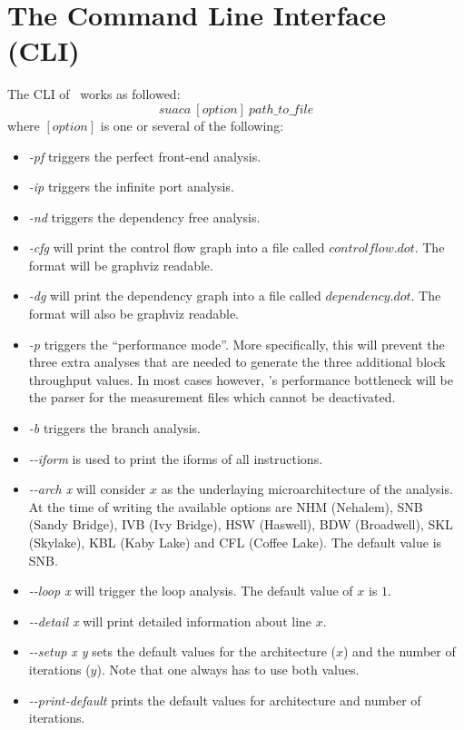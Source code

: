\section{The Command Line Interface (CLI)}
The CLI of \suaca\ works as followed:\\
\[
suaca\ [option]\ path\_to\_file
\]
where $[option]$ is one or several of the following:
\begin{itemize}
    \item \emph{-pf} triggers the perfect front-end analysis.
    \item \emph{-ip} triggers the infinite port analysis.
    \item \emph{-nd} triggers the dependency free analysis. 
    \item \emph{-cfg} will print the control flow graph into a file called $controlflow.dot$. The format will be graphviz readable.
    \item \emph{-dg} will print the dependency graph into a file called $dependency.dot$. The format will also be graphviz readable.
    \item \emph{-p} triggers the ``performance mode''. More specifically, this will prevent the three extra analyses that are needed to generate the three additional block throughput values. In most cases however, \suaca's performance bottleneck will be the parser for the measurement files which cannot be deactivated. 
    \item \emph{-b} triggers the branch analysis.
    \item \emph{-{}-iform} is used to print the iforms of all instructions.
    \item \emph{-{}-arch x} will consider $x$ as the underlaying microarchitecture of the analysis. At the time of writing the available options are NHM (Nehalem), SNB (Sandy Bridge), IVB (Ivy Bridge), HSW (Haswell), BDW (Broadwell), SKL (Skylake), KBL (Kaby Lake) and CFL (Coffee Lake). The default value is SNB.
    \item \emph{-{}-loop x} will trigger the loop analysis. The default value of $x$ is $1$.
    \item \emph{-{}-detail x} will print detailed information about line $x$.
     \item \emph{-{}-setup x y} sets the default values for the architecture ($x$) and the number of iterations ($y$). Note that one always has to use both values. 
    \item \emph{-{}-print-default} prints the default values for architecture and number of iterations.
\end{itemize}



